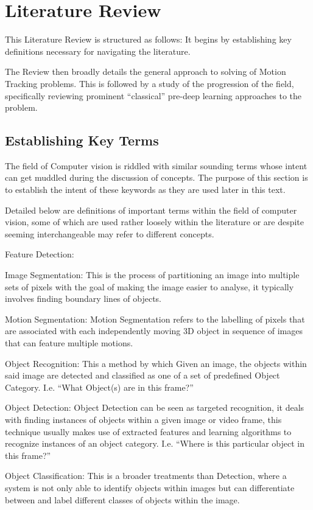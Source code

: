 \chapter{Literature Review}\label{literature_review}
This Literature Review is structured as follows: It begins by establishing key
definitions necessary for navigating the literature.

The Review then broadly details the general approach to solving of Motion Tracking
problems. This is followed by a study of the progression of the field,
specifically reviewing prominent “classical” pre-deep learning approaches to the
problem.

\section{Establishing Key Terms}
The field of Computer vision is riddled with similar sounding terms whose intent
can get muddled during the discussion of concepts.  The purpose of this section
is to establish the intent of these keywords as they are used later in this text.

Detailed below are definitions of important terms within the field of computer
vision, some of which are used rather loosely within the literature or are
despite seeming interchangeable may refer to different concepts. 

Feature Detection:

Image Segmentation: This is the process of partitioning an image into multiple
sets of pixels with the goal of making the image easier to analyse, it typically
involves finding boundary lines of objects. 

Motion Segmentation: Motion Segmentation refers to the labelling of pixels that
are associated with each independently moving 3D object in sequence of images
that can feature multiple motions.~\cite{Tekalp2014}

Object Recognition: This a method by which Given an image, the objects within
said image are detected and classified as one of a set of predefined Object
Category.  I.e. “What Object(s) are in this frame?”

Object Detection: Object Detection can be seen as targeted recognition, it deals
with finding instances of objects within a given image or video frame, this
technique usually makes use of extracted features and learning algorithms to
recognize instances of an object category.  I.e. “Where is this particular
object in this frame?”

Object Classification: This is a broader treatments than Detection, where a
system is not only able to identify objects within images but can differentiate
between and label different classes of objects within the image. 

